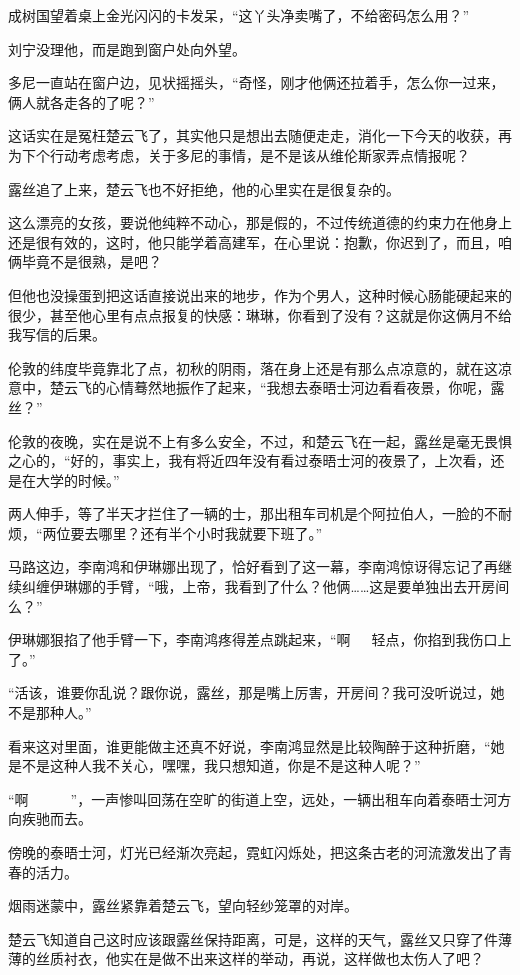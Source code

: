成树国望着桌上金光闪闪的卡发呆，“这丫头净卖嘴了，不给密码怎么用？”

刘宁没理他，而是跑到窗户处向外望。

多尼一直站在窗户边，见状摇摇头，“奇怪，刚才他俩还拉着手，怎么你一过来，俩人就各走各的了呢？”

这话实在是冤枉楚云飞了，其实他只是想出去随便走走，消化一下今天的收获，再为下个行动考虑考虑，关于多尼的事情，是不是该从维伦斯家弄点情报呢？

露丝追了上来，楚云飞也不好拒绝，他的心里实在是很复杂的。

这么漂亮的女孩，要说他纯粹不动心，那是假的，不过传统道德的约束力在他身上还是很有效的，这时，他只能学着高建军，在心里说：抱歉，你迟到了，而且，咱俩毕竟不是很熟，是吧？

但他也没操蛋到把这话直接说出来的地步，作为个男人，这种时候心肠能硬起来的很少，甚至他心里有点点报复的快感：琳琳，你看到了没有？这就是你这俩月不给我写信的后果。

伦敦的纬度毕竟靠北了点，初秋的阴雨，落在身上还是有那么点凉意的，就在这凉意中，楚云飞的心情蓦然地振作了起来，“我想去泰晤士河边看看夜景，你呢，露丝？”

伦敦的夜晚，实在是说不上有多么安全，不过，和楚云飞在一起，露丝是毫无畏惧之心的，“好的，事实上，我有将近四年没有看过泰晤士河的夜景了，上次看，还是在大学的时候。”

两人伸手，等了半天才拦住了一辆的士，那出租车司机是个阿拉伯人，一脸的不耐烦，“两位要去哪里？还有半个小时我就要下班了。”

马路这边，李南鸿和伊琳娜出现了，恰好看到了这一幕，李南鸿惊讶得忘记了再继续纠缠伊琳娜的手臂，“哦，上帝，我看到了什么？他俩……这是要单独出去开房间么？”

伊琳娜狠掐了他手臂一下，李南鸿疼得差点跳起来，“啊~~~轻点，你掐到我伤口上了。”

“活该，谁要你乱说？跟你说，露丝，那是嘴上厉害，开房间？我可没听说过，她不是那种人。”

看来这对里面，谁更能做主还真不好说，李南鸿显然是比较陶醉于这种折磨，“她是不是这种人我不关心，嘿嘿，我只想知道，你是不是这种人呢？”

“啊~~~~~~”，一声惨叫回荡在空旷的街道上空，远处，一辆出租车向着泰晤士河方向疾驰而去。

傍晚的泰晤士河，灯光已经渐次亮起，霓虹闪烁处，把这条古老的河流激发出了青春的活力。

烟雨迷蒙中，露丝紧靠着楚云飞，望向轻纱笼罩的对岸。

楚云飞知道自己这时应该跟露丝保持距离，可是，这样的天气，露丝又只穿了件薄薄的丝质衬衣，他实在是做不出来这样的举动，再说，这样做也太伤人了吧？

